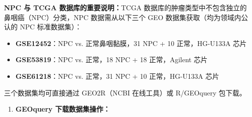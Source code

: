\documentclass[12pt,a4paper,twoside]{article}
\begin{document}
\begin{warningbox}
\textbf{NPC 与 TCGA 数据库的重要说明：}TCGA 数据库的肿瘤类型中不包含独立的鼻咽癌（NPC）分类，NPC 数据需从以下三个 GEO 数据集获取（均为领域内公认的 NPC 标准数据集）：
\begin{itemize}
  \item \textbf{GSE12452}：NPC vs. 正常鼻咽黏膜，31 NPC + 10 正常，HG-U133A 芯片
  \item \textbf{GSE53819}：NPC vs. 正常，18 NPC + 18 正常，Agilent 芯片
  \item \textbf{GSE61218}：NPC vs. 正常，31 NPC + 10 正常，HG-U133A 芯片
\end{itemize}
三个数据集均可直接通过 GEO2R（NCBI 在线工具）或 R/GEOquery 包下载。
\end{warningbox}

\begin{enumerate}
  \item \textbf{GEOquery 下载数据集操作：}
\end{enumerate}
\end{document}
